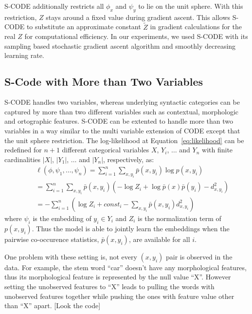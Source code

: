 S-CODE \cite{maron2010sphere} additionally restricts all $\phi_x$ and
$\psi_y$ to lie on the unit sphere.  With this restriction, $Z$ stays
around a fixed value during gradient ascent.  This allows S-CODE to
substitute an approximate constant $\tilde{Z}$ in gradient
calculations for the real $Z$ for computational efficiency.  In our
experiments, we used S-CODE with its sampling based stochastic
gradient ascent algorithm and smoothly decreasing learning
rate.

\subsection{S-Code with More than Two Variables}

S-CODE handles two variables, whereas underlying syntactic categories
can be captured by more than two different variables such as
contextual, morphologic and ortographic features.  S-CODE can be
extented to handle more than two variables in a way similar to the
multi variable extension of CODE \cite{globerson2007euclidean} except
that the unit sphere restriction.  The log-likelihood at
Equation~\ref{eq:likelihood} can be redefined for $n+1$ different
categorical variables $X$, $Y_i$, $\hdots$ and $Y_n$ with finite
cardinalities $|X|$, $|Y_1|$, $\hdots$ and $|Y_n|$, respectively, as:
\begin{eqnarray}
&&\ell(\phi, \psi_1,\hdots,\psi_n) = \sum_{i=1}^n\sum_{x,y_i} \bar{p}(x,y_i) \log p(x,y_i) \label{eq:multilikelihood} \\
&&= \sum_{i=1}^n\sum_{x,y_i} \bar{p}(x,y_i) (-\log Z_i + \log \bar{p}(x)\bar{p}(y_i) - d^2_{x,y_i}) \nonumber \\
&&=-\sum_{i=1}^n(\log Z_i + \mathit{const}_i - \sum_{x,y_i} \bar{p}(x,y_i) d^2_{x,y_i}) \nonumber
\end{eqnarray}
where $\psi_i$ is the embedding of $y_i \in Y_i$ and $Z_i$ is the
normalization term of $p(x,y_i)$.  Thus the model is able to
jointly learn the embeddings when the pairwise co-occurence statistics,
$\bar{p}(x,y_i)$, are available for all $i$.

One problem with these setting is, not every $(x,y_i)$ pair is
observed in the data.  For example, the stem word ``car'' doesn't have
any morphological features, thus its morphological feature is
represented by the null value ``X''.  However setting the unobserved
features to ``X'' leads to pulling the words with unobserved features
together while pushing the ones with feature value other than ``X''
apart.  [Look the code]

